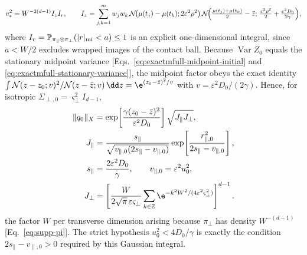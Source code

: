 \begin{remark}
\begin{equation}
 v_*^2=W^{-2(d-1)}I_zI_r,
 \qquad
 I_z=\sum_{j,k=1}^{m}w_jw_k\,
 \mathcal N\!\bigl(\mu(t_j)-\mu(t_k);2\varepsilon^2\rho^2\bigr)\,
 \mathcal N\!\Bigl(\tfrac{\mu(t_j)+\mu(t_k)}{2}-\bar z;\,
 \tfrac{\varepsilon^2\rho^2}{2}+\tfrac{\varepsilon^2D_0}{2\gamma}\Bigr),
 \label{eq:exactmfull-b0-vstar}
\end{equation}
where
\(I_r=\mathbb P_{\pi_\parallel\otimes\pi_\perp}(|r|_{\rm mi}<a)\le1\)
is an explicit one-dimensional integral, since \(a<W/2\) excludes wrapped
images of the contact ball.  Because \(\operatorname{Var}Z_0\) equals the
stationary midpoint variance
[Eqs.~\eqref{eq:exactmfull-midpoint-initial} and
\eqref{eq:exactmfull-stationary-variance}], the midpoint factor obeys the
exact identity
\(\int\mathcal N(z-z_0;v)^2/\mathcal N(z-\bar z;v)\,\dd z
=\e^{(z_0-\bar z)^2/v}\) with \(v=\varepsilon^2D_0/(2\gamma)\).  Hence,
for isotropic \(\Sigma_{\perp,0}=\varsigma_\perp^2I_{d-1}\),
\begin{equation}
 \begin{aligned}
 \|q_0\|_X
 &=\exp\!\left[\frac{\gamma(z_0-\bar z)^2}
                     {\varepsilon^2D_0}\right]
   \sqrt{J_\parallel J_\perp},\\
 J_\parallel
 &=\frac{s_\parallel}
 {\sqrt{v_{\parallel,0}(2s_\parallel-v_{\parallel,0})}}
 \exp\!\left[
  \frac{r_{\parallel,0}^2}{2s_\parallel-v_{\parallel,0}}
 \right],\\
 s_\parallel&=\frac{2\varepsilon^2D_0}{\gamma},\qquad
 v_{\parallel,0}=\varepsilon^2u_0^2,\\
 J_\perp
 &=\left[\frac{W}{2\sqrt{\pi}\,\varepsilon\varsigma_\perp}
 \sum_{k\in\mathbb Z}
 \e^{-k^2W^2/(4\varepsilon^2\varsigma_\perp^2)}\right]^{d-1}.
 \end{aligned}
 \label{eq:exactmfull-b0-q0norm}
\end{equation}
the factor \(W\) per transverse dimension arising because \(\pi_\perp\) has
density \(W^{-(d-1)}\) [Eq.~\eqref{eq:supp-pi}].  The strict hypothesis
\(u_0^2<4D_0/\gamma\) is exactly the condition
\(2s_\parallel-v_{\parallel,0}>0\) required by this Gaussian integral.


\end{remark}
